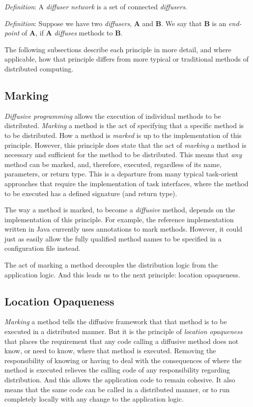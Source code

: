 \documentclass[11pt]{article}
\begin{document}
\begin{description}
	\emph{Definition}: A \emph{diffuser network} is a set of connected \emph{diffusers}.
	
	\emph{Definition}: Suppose we have two \emph{diffusers}, \textbf{A} and \textbf{B}. We say that \textbf{B} is an \emph{end-point} of \textbf{A}, if \textbf{A} \emph{diffuses} methods to \textbf{B}.

\end{description}

The following subsections describe each principle in more detail, and where applicable, how that principle differs from more typical or traditional methods of distributed computing.

\subsection{Marking\label{sec:marking}}
\emph{Diffusive programming} allows the execution of individual methods to be distributed. \emph{Marking} a method is the act of specifying that a specific method is to be distributed. How a method is \emph{marked} is up to the implementation of this principle. However, this principle does state that the act of \emph{marking} a method is necessary and sufficient for the method to be distributed. This means that \emph{any} method can be marked, and, therefore, executed, regardless of its name, parameters, or return type. This is a departure from many typical task-orient approaches that require the implementation of task interfaces, where the method to be executed has a defined signature (and return type).

The way a method is marked, to become a \emph{diffusive} method, depends on the implementation of this principle. For example, the reference implementation written in Java currently uses annotations to mark methods. However, it could just as easily allow the fully qualified method names to be specified in a configuration file instead.

The act of marking a method decouples the distribution logic from the application logic. And this leads us to the next principle: location opaqueness.

\subsection{Location Opaqueness\label{location_opaqueness}}
\emph{Marking} a method tells the diffusive framework that that method is to be executed in a distributed manner. But it is the principle of \emph{location opaqueness} that places the requirement that any code calling a diffusive method does not know, or need to know, where that method is executed. Removing the responsibility of knowing or having to deal with the consequences of where the method is executed relieves the calling code of any responsibility regarding distribution. And this allows the application code to remain cohesive. It also means that the same code can be called in a distributed manner, or to run completely locally with any change to the application logic.
\end{document}
